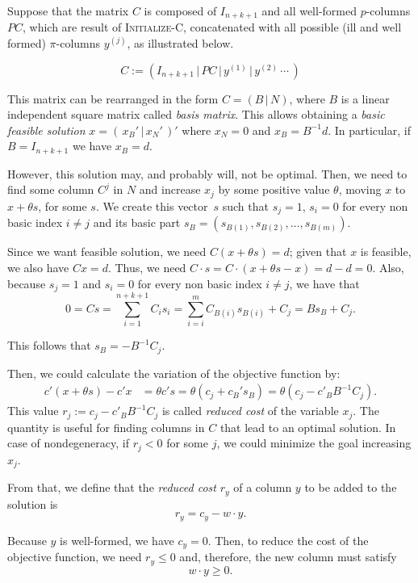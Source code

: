 Suppose that the matrix $C$ is composed of $I_{n+k+1}$ and all well-formed $p$-columns $PC$, which are result of \textsc{Initialize-C}, concatenated with all possible (ill and well formed) $\pi$-columns $y^{(j)}$, as illustrated below.

\[
	C := \left( I_{n+k+1} \, | \, PC \, | \, y^{(1)} \, | \, y^{(2)} \, \cdots \, \right)
\]

This matrix can be rearranged in the form $C = (B \, | \, N)$, where $B$ is a linear independent square matrix called \emph{basis matrix}. This allows obtaining a \emph{basic feasible solution} $x = (\, x_B' \, | \, x_N' \,)'$ where $x_N = 0$ and $x_B = B^{-1}d$. In particular, if $B = I_{n+k+1}$ we have $x_B = d$.


However, this solution may, and probably will, not be optimal. Then, we need to find some column $C^j$ in $N$ and increase $x_j$ by some positive value $\theta$, moving $x$ to $x + \theta s$, for some $s$. We create this vector~$s$ such that $s_j = 1$, $s_i = 0$ for every non basic index $i \neq j$ and its basic part $s_B = (s_{B(1)}, s_{B(2)}, \dots, s_{B(m)})$.

Since we want feasible solution, we need $C (x + \theta s) = d$; given that $x$ is feasible, we also have $C x = d$. Thus, we need $C \cdot s = C \cdot (x + \theta s - x) = d - d = 0$. Also, because $s_j = 1$ and $s_i = 0$ for every non basic index $i \neq j$, we have that
\[
	0 = C s = \sum_{i = 1}^{n + k + 1} C_i s_i = \sum_{i = i}^m C_{B(i)} s_{B(i)} + C_j = B s_B + C_j.
\]

This follows that $s_B = - B^{-1} C_j$.

Then, we could calculate the variation of the objective function by:
\begin{align*}
	c' (x + \theta s) - c'x & = \theta c's = \theta (c_j + c_B' s_B) = \theta (c_j - c'_B B^{-1} C_j).
\end{align*}
This value $r_j := c_j - c'_B B^{-1} C_j$ is called \emph{reduced cost} of the variable $x_j$. The quantity is useful for finding columns in $C$ that lead to an optimal solution. In case of nondegeneracy, if $r_j < 0$ for some $j$, we could minimize the goal increasing $x_j$.


From that, we define that the \emph{reduced cost} $r_y$ of a column $y$ to be added to the solution is
\[
	r_y = c_y - w \cdot y.
\]

Because $y$ is well-formed, we have $c_y = 0$. Then, to reduce the cost of the objective function, we need $r_y \leq 0$ and, therefore, the new column must satisfy
\begin{equation}
	\label{eq:col-restr}
	w \cdot y \geq 0.
\end{equation}

